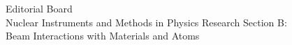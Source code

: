 \documentclass{letter} %
\begin{document}
\begin{letter}{Editorial Board \\
Nuclear Instruments and Methods in Physics Research Section B: \\
Beam Interactions with Materials and Atoms}









\end{letter}
\end{document}
